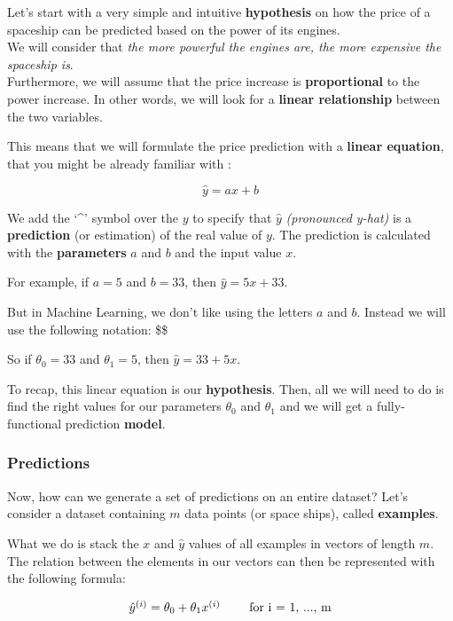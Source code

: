 \documentclass[]{article}
\begin{document}
Let's start with a very simple and intuitive \textbf{hypothesis} on how
the price of a spaceship can be predicted based on the power of its
engines.\\
We will consider that \emph{the more powerful the engines are, the more
expensive the spaceship is}.\\
Furthermore, we will assume that the price increase is
\textbf{proportional} to the power increase. In other words, we will
look for a \textbf{linear relationship} between the two variables.

This means that we will formulate the price prediction with a
\textbf{linear equation}, that you might be already familiar with :

\large

\[
\hat{y} = ax + b
\] \normalsize

We add the `\^{}' symbol over the \(y\) to specify that \(\hat{y}\)
\emph{(pronounced y-hat)} is a \textbf{prediction} (or estimation) of
the real value of \(y\). The prediction is calculated with the
\textbf{parameters} \(a\) and \(b\) and the input value \(x\).

For example, if \(a = 5\) and \(b = 33\), then \(\hat{y} = 5x + 33\).

But in Machine Learning, we don't like using the letters \(a\) and
\(b\). Instead we will use the following notation: \large \$\$

So if \(\theta_0 = 33\) and \(\theta_1 = 5\), then \(\hat{y} = 33+ 5x\).

To recap, this linear equation is our \textbf{hypothesis}. Then, all we
will need to do is find the right values for our parameters \(\theta_0\)
and \(\theta_1\) and we will get a fully-functional prediction
\textbf{model}.

\hypertarget{predictions}{%
\subsubsection{Predictions}\label{predictions}}

Now, how can we generate a set of predictions on an entire dataset?
Let's consider a dataset containing \(m\) data points (or space ships),
called \textbf{examples}.

What we do is stack the \(x\) and \(\hat{y}\) values of all examples in
vectors of length \(m\). The relation between the elements in our
vectors can then be represented with the following formula:

\[
\normalsize
\begin{matrix}
\hat{y}^{(i)} = \theta_0 + \theta_1 x^{(i)} & & \text{ for i = 1, ..., m}
\end{matrix}
\large
\]
\end{document}
